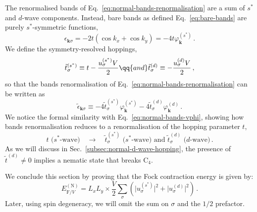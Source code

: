 The renormalised bands of Eq.~\eqref{eq:normal-bands-renormalisation} are a sum of $s^*$ and $d$-wave components. Instead, bare bands as defined Eq.~\eqref{eq:bare-bands} are purely $s^*$-symmetric functions, 
\begin{equation}\label{eq:normal-bands-vphi}
	\epsilon_{\mathbf{k}\sigma} = -2t (\cos k_x + \cos k_y) = -4t \varphi_\mathbf{k}^{(s^*)} \, .
\end{equation}
We define the symmetry-resolved hoppings,
\begin{equation}\label{eq:normal-tS-td}
	\tilde{t}^{(s^*)}_\sigma \equiv t - \frac{u_\sigma^{(s^*)} V}{2}
	\qq{and}
	\tilde{t}^{(d)}_\sigma \equiv - \frac{u_\sigma^{(d)} V}{2} \, ,
\end{equation}
so that the bands renormalisation of Eq.~\eqref{eq:normal-bands-renormalisation} can be written as
\begin{equation}\label{eq:normal-bands-renormalisation-vphi}
	\tilde{\epsilon}_{\mathbf{k}\sigma} \equiv -4\tilde{t}^{(s^*)}_\sigma \varphi_\mathbf{k}^{(s^*)} -4\tilde{t}^{(d)}_\sigma \varphi_\mathbf{k}^{(d)} \, .
\end{equation}
We notice the formal similarity with Eq.~\eqref{eq:normal-bands-vphi}, showing how bands renormalisation reduces to a renormalisation of the hopping parameter $t$,
\[
	\text{$t$ ($s^*$-wave)}
	\quad\to\quad
	\text{$\tilde{t}^{(s^*)}_\sigma$ ($s^*$-wave) and $\tilde{t}^{(d)}_\sigma$ ($d$-wave)} \, .
\]
As we will discuss in Sec.~\ref{subsec:normal-d-wave-hopping}, the presence of $\tilde{t}^{(d)} \neq 0$ implies a nematic state that breaks $\mathrm{C}_4$.

We conclude this section by proving that the Fock contraction energy is given by:
\begin{equation}\label{eq:normal-HV-fock-Ec}
	E_{\mathrm{F}/V}^{(\mathrm{N})} = L_x L_y \times \frac{V}{2} \sum_\sigma \left(
		\big|
			u_\sigma^{(s^*)}
		\big|^2 + \big|
			u_\sigma^{(d)}
		\big|^2
	\right) \, .
\end{equation}
Later, using spin degeneracy, we will omit the sum on $\sigma$ and the $1/2$ prefactor.


